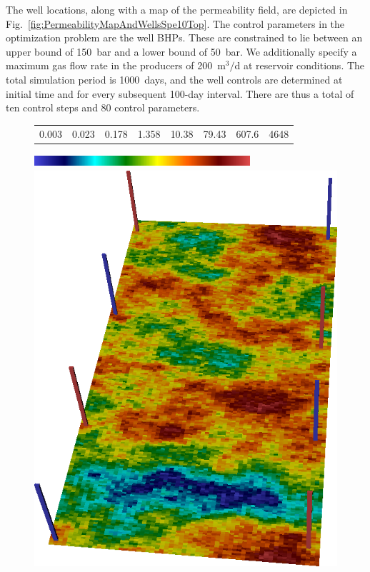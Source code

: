 \documentclass[twocolumn,numbook]{svjour3}          %
\begin{document}
The well locations, along with a map of the permeability field, are depicted in
Fig.~\ref{fig:PermeabilityMapAndWellsSpe10Top}. The control parameters in the
optimization problem are the well BHPs. These are constrained to lie between an
upper bound of 150~bar and a lower bound of 50~bar. We additionally specify a
maximum gas flow rate in the producers of 200~m$^3/$d at reservoir conditions.
The total simulation period is 1000~days, and the well controls are determined
at initial time and for every subsequent 100-day interval. There are thus a
total of ten control steps and 80 control parameters.


%
\begin{figure}[ht]
\begin{center}
     \begin{tabular}{cccccccc}
      0.003 &  0.023 & 0.178 & 1.358 & 10.38 & 79.43 & 607.6 &4648
      \end{tabular}
      \includegraphics[width=8cm, height=0.5cm]{VanEssenModelPermeabilityMapColorBar.png}
       
       \medskip

       \includegraphics[totalheight=3.2in]{SPE10TopModelPermeabilityMapConstantRotated.png} %


\end{center}
\end{figure}
\end{document}
